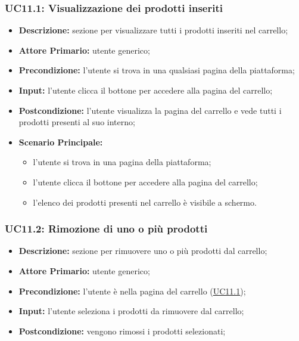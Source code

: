 \subsubsection{UC11.1: Visualizzazione dei prodotti inseriti}
\label{sec:UC11.1}
\begin{itemize}
    \item \textbf{Descrizione:} sezione per visualizzare tutti i prodotti inseriti nel carrello;
    \item \textbf{Attore Primario:} utente generico;
    \item \textbf{Precondizione:}  l'utente si trova in una qualsiasi pagina della piattaforma;
    \item \textbf{Input:} l'utente clicca il bottone per accedere alla pagina del carrello;
    \item \textbf{Postcondizione:} l'utente visualizza la pagina del carrello e vede tutti i prodotti presenti al suo interno;
    \item \textbf{Scenario Principale:}
          \begin{itemize}
              \item l'utente si trova in una pagina della piattaforma;
              \item l'utente clicca il bottone per accedere alla pagina del carrello;
              \item l'elenco dei prodotti presenti nel carrello è visibile a schermo.
          \end{itemize}
\end{itemize}
\subsubsection{UC11.2: Rimozione di uno o più prodotti}
\label{sec:UC11.2}
\begin{itemize}
    \item \textbf{Descrizione:} sezione per rimuovere uno o più prodotti dal carrello;
    \item \textbf{Attore Primario:} utente generico;
    \item \textbf{Precondizione:} l'utente è nella pagina del carrello (\hyperref[sec:UC11.1]{\underline{UC11.1}});
    \item \textbf{Input:} l'utente seleziona i prodotti da rimuovere dal carrello;
    \item \textbf{Postcondizione:} vengono rimossi i prodotti selezionati;
\end{itemize}
